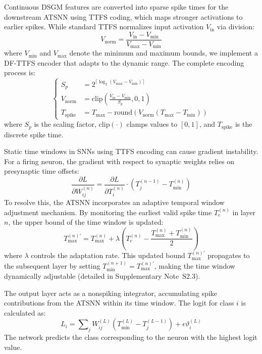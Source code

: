 \documentclass{nsr}
\begin{document}
Continuous DSGM features are converted into sparse spike times for the downstream ATSNN using TTFS coding, which maps stronger activations to earlier spikes. While standard TTFS normalizes input activation $V_{\mathrm{in}}$ via division:
\begin{equation}
V_{\mathrm{norm}} = \frac{V_{\mathrm{in}} - V_{\min}}{V_{\max} - V_{\min}}
\label{eq:standard_ttfs}
\end{equation}
where $V_{\min}$ and $V_{\max}$ denote the minimum and maximum bounds, we implement a DF-TTFS encoder that adapts to the dynamic range. The complete encoding process is:  
\begin{equation}
\left\{
\begin{aligned}
S_p &= 2^{\lceil \log_2(V_{\max}-V_{\min}) \rceil} \\
V_{\mathrm{norm}} &= \mathrm{clip}\left(\frac{V_{\mathrm{in}}-V_{\min}}{S_p}, 0, 1\right) \\
T_{\mathrm{spike}} &= T_{\max} - \mathrm{round}\left(V_{\mathrm{norm}} (T_{\max}-T_{\min})\right)
\end{aligned}
\right.
\label{eq:ttfs_div_free}
\end{equation}
where $S_p$ is the scaling factor, $\mathrm{clip}(\cdot)$ clamps values to $[0,1]$, and $T_{\mathrm{spike}}$ is the discrete spike time.

Static time windows in SNNs using TTFS encoding can cause gradient instability. For a firing neuron, the gradient with respect to synaptic weights relies on presynaptic time offsets:
\begin{equation}
\frac{\partial L}{\partial W_{ij}^{(n)}} = \frac{\partial L}{\partial T_i^{(n)}} \cdot \left(T_j^{(n-1)} - T_{\min}^{(n)}\right)
\label{eq:grad_w}
\end{equation}
To resolve this, the ATSNN incorporates an adaptive temporal window adjustment mechanism. By monitoring the earliest valid spike time $T_{e}^{(n)}$ in layer $n$, the upper bound of the time window is updated:
\begin{equation}
T_{\max}^{(n)\prime} = T_{\max}^{(n)} + \lambda\!\left(T_{e}^{(n)} - \frac{T_{\max}^{(n)} + T_{\min}^{(n)}}{2}\right)
\label{eq:atsnn_update}
\end{equation}
where $\lambda$ controls the adaptation rate. This updated bound $T_{\max}^{(n)\prime}$ propagates to the subsequent layer by setting $T_{\min}^{(n+1)} = T_{\max}^{(n)\prime}$, making the time window dynamically adjustable (detailed in Supplementary Note~S2.3).

The output layer acts as a nonspiking integrator, accumulating spike contributions from the ATSNN within its time window. The logit for class $i$ is calculated as:
\begin{equation}
L_i = \sum\nolimits_j W_{ij}^{(L)}\!\left(T_{\min}^{(L)} - T_j^{(L-1)}\right) + \epsilon \vartheta_i^{(L)}
\label{eq:out_logit}
\end{equation}
The network predicts the class corresponding to the neuron with the highest logit value.
\end{document}
